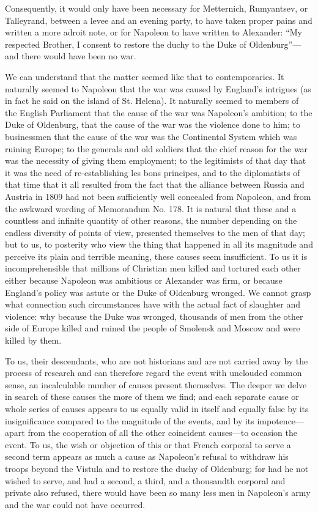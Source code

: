 Consequently, it would only have been necessary for Metternich,
Rumyantsev, or Talleyrand, between a levee and an evening party,
to have taken proper pains and written a more adroit note, or for
Napoleon to have written to Alexander: ``My respected Brother, I
consent to restore the duchy to the Duke of Oldenburg''---and
there would have been no war.

We can understand that the matter seemed like that to
contemporaries. It naturally seemed to Napoleon that the war was
caused by England's intrigues (as in fact he said on the island
of St. Helena). It naturally seemed to members of the English
Parliament that the cause of the war was Napoleon's ambition; to
the Duke of Oldenburg, that the cause of the war was the violence
done to him; to businessmen that the cause of the war was the
Continental System which was ruining Europe; to the generals and
old soldiers that the chief reason for the war was the necessity
of giving them employment; to the legitimists of that day that it
was the need of re-establishing les bons principes, and to the
diplomatists of that time that it all resulted from the fact that
the alliance between Russia and Austria in 1809 had not been
sufficiently well concealed from Napoleon, and from the awkward
wording of Memorandum No. 178. It is natural that these and a
countless and infinite quantity of other reasons, the number
depending on the endless diversity of points of view, presented
themselves to the men of that day; but to us, to posterity who
view the thing that happened in all its magnitude and perceive
its plain and terrible meaning, these causes seem insufficient.
To us it is incomprehensible that millions of Christian men
killed and tortured each other either because Napoleon was
ambitious or Alexander was firm, or because England's policy was
astute or the Duke of Oldenburg wronged. We cannot grasp what
connection such circumstances have with the actual fact of
slaughter and violence: why because the Duke was wronged,
thousands of men from the other side of Europe killed and ruined
the people of Smolensk and Moscow and were killed by them.

To us, their descendants, who are not historians and are not
carried away by the process of research and can therefore regard
the event with unclouded common sense, an incalculable number of
causes present themselves. The deeper we delve in search of these
causes the more of them we find; and each separate cause or whole
series of causes appears to us equally valid in itself and
equally false by its insignificance compared to the magnitude of
the events, and by its impotence---apart from the cooperation of
all the other coincident causes---to occasion the event. To us,
the wish or objection of this or that French corporal to serve a
second term appears as much a cause as Napoleon's refusal to
withdraw his troops beyond the Vistula and to restore the duchy
of Oldenburg; for had he not wished to serve, and had a second, a
third, and a thousandth corporal and private also refused, there
would have been so many less men in Napoleon's army and the war
could not have occurred.

